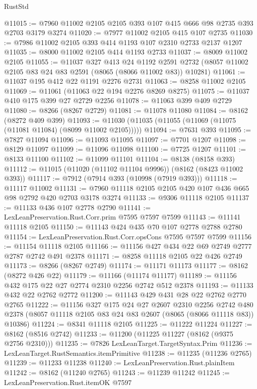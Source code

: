 \begin{lexlean}{RustStd}
\begin{coremodule}
@11015 := @7960 @11002 @2105 @2105 @393 @107 @415 @666 @98 @2735 @393 @2703 @3179 @3274
@11020 := @7977 @11002 @2105 @415 @107 @2735
@11030 := @7986 @11002 @2105 @393 @414 @1193 @107 @2310 @2733 @2137 @1207
@11035 := @8000 @11002 @2105 @414 @1193 @2733
@11037 := @8009 @11002 @2105
@11055 := @11037
    @327
    @413
    @24
    @1192
    @2591
    @2732
    (@8057 @11002 @2105 @83 @24 @83 @2591 (@8065 (@8066 @11002 @83)) @10281)
@11061 := @11037 @195 @412 @22 @1191 @2276 @2731
@11063 := @8258 @11002 @2105
@11069 := @11061 (@11063 @22 @194 @2276 @8269 @8275)
@11075 := @11037 @410 @175 @399 @27 @2729 @2256
@11078 := @11063 @399 @409 @2729
@11080 := @8266 (@8267 @2729)
@11081 := @11078 @11080
@11084 := @8162 (@8272 @409 @399)
@11093 := @11030 (@11035 (@11055 (@11069 (@11075 (@11081 @11084) (@8099 @11002 @2105)))))
@11094 := @7631 @393
@11095 := @7827 @11094
@11096 := @11093 @11095
@11097 := @7701 @1207
@11098 := @8129 @11097
@11099 := @11096 @11098
@11100 := @7725 @1207
@11101 := @8133 @11100
@11102 := @11099 @11101
@11104 := @8138 (@8158 @393)
@11112 := @11015 (@11020 (@11102 @11104 @9996)) (@8162 (@8423 @11002 @393))
@11117 := @7912 (@7914 @393 (@10998 (@7919 @393)))
@11118 := @11117 @11002
@11131 := @7960 @11118 @2105 @2105 @420 @107 @436 @665 @98 @2792 @420 @2703 @3178 @3274
@11133 := @9306 @11118 @2105
@11137 := @11133 @436 @107 @2778 @2790
@11141 := LexLeanPreservation.Rust.Corr.prim @7595 @7597 @7599
@11143 := @11141 @11118 @2105
@11150 := @11143 @424 @435 @70 @107 @2778 @2788 @2780
@11154 := LexLeanPreservation.Rust.Corr.opsCons @7595 @7597 @7599
@11156 := @11154 @11118 @2105
@11166 := @11156 @427 @434 @22 @69 @2749 @2777 @2787 @2742 @491 @2378
@11171 := @8258 @11118 @2105 @22 @426 @2749
@11173 := @8266 (@8267 @2749)
@11174 := @11171 @11173
@11177 := @8162 (@8272 @426 @22)
@11179 := @11166 (@11174 @11177)
@11189 := @11156 @432 @175 @22 @27 @2774 @2310 @2256 @2742 @512 @2378
@11193 := @11133 @432 @22 @2762 @2772
@11200 := @11143 @429 @431 @28 @22 @2762 @2770 @2765
@11222 := @11156
    @327
    @175
    @24
    @27
    @2607
    @2310
    @2256
    @2742
    @480
    @2378
    (@8057 @11118 @2105 @83 @24 @83 @2607 (@8065 (@8066 @11118 @83)) @10386)
@11224 := @8341 @11118 @2105
@11225 := @11222 @11224
@11227 := @8162 (@8516 @2742)
@11233 := @11200 (@11225 @11227 (@8162 (@9375 @2756 @2310)))
@11235 := @7826 LexLeanTarget.TargetSyntax.Prim
@11236 := LexLeanTarget.RustSemantics.itemPrimitive
@11238 := @11235 (@11236 @2765)
@11239 := @11233 @11238
@11240 := LexLeanPreservation.Rust.plainItem
@11242 := @8162 (@11240 @2765)
@11243 := @11239 @11242
@11245 := LexLeanPreservation.Rust.itemOK @7597

\end{coremodule}
\end{lexlean}
